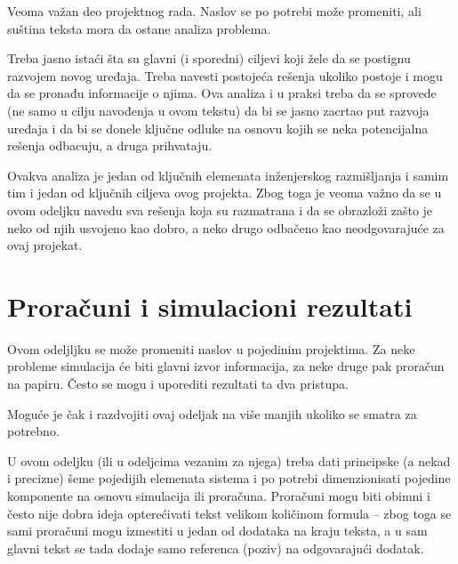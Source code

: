 \documentclass[a4paper, 12pt]{article}
\begin{document}
\vspace{10pt}

Veoma važan deo projektnog rada. Naslov se po potrebi može promeniti, ali suština teksta mora da ostane analiza problema.

\vspace{10pt}

Treba jasno istaći šta su glavni (i sporedni) ciljevi koji žele da se postignu razvojem novog uređaja. Treba navesti postojeća rešenja ukoliko postoje i mogu da se pronađu informacije o njima. Ova analiza i u praksi treba da se sprovede (ne samo u cilju navođenja u ovom tekstu) da bi se jasno zacrtao put razvoja uređaja i da bi se donele ključne odluke na osnovu kojih se neka potencijalna rešenja odbacuju, a druga prihvataju.

\vspace{10pt}

Ovakva analiza je jedan od ključnih elemenata inženjerskog razmišljanja i samim tim i jedan od ključnih ciljeva ovog projekta. Zbog toga je veoma važno da se u ovom odeljku navedu sva rešenja koja su razmatrana i da se obrazloži zašto je neko od njih usvojeno kao dobro, a neko drugo odbačeno kao neodgovarajuće za ovaj projekat.
\pagebreak

\section{Proračuni i simulacioni rezultati}

\vspace{10pt}

Ovom odeljljku se može promeniti naslov u pojedinim projektima. Za neke probleme simulacija će biti glavni izvor informacija, za neke druge pak proračun na papiru. Često se mogu i uporediti rezultati ta dva pristupa.

\vspace{10pt}

Moguće je čak i razdvojiti ovaj odeljak na više manjih ukoliko se smatra za potrebno.

\vspace{10pt}

U ovom odeljku (ili u odeljcima vezanim za njega) treba dati principske (a nekad i precizne) šeme pojedijih elemenata sistema i po potrebi dimenzionisati pojedine komponente na osnovu simulacija ili proračuna. Proračuni mogu biti obimni i često nije dobra ideja opterećivati tekst velikom količinom formula – zbog toga se sami proračuni mogu izmestiti u jedan od dodataka na kraju teksta, a u sam glavni tekst se tada dodaje samo referenca (poziv) na odgovarajući dodatak.
\end{document}
